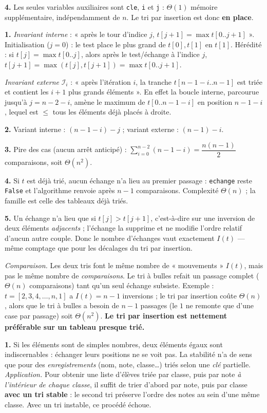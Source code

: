 \documentclass[11pt,a4paper]{article}
\begin{document}
\textbf{4.} Les seules variables auxiliaires sont \texttt{cle}, \texttt{i} et
\texttt{j} : $\Theta(1)$ mémoire supplémentaire, indépendamment de $n$. Le tri par
insertion est donc \textbf{en place}.

\reponse
\textbf{1.} \emph{Invariant interne} : « après le tour d'indice $j$, $t[j+1]=\max
t[0..j+1]$ ». Initialisation ($j=0$) : le test place le plus grand de $t[0],t[1]$ en
$t[1]$. Hérédité : si $t[j]=\max t[0..j]$, alors après le test/échange à l'indice $j$,
$t[j+1]=\max(t[j],t[j+1])=\max t[0..j+1]$. \checkmark

\emph{Invariant externe} $\mathcal I_i$ : « après l'itération $i$, la tranche
$t[n-1-i..n-1]$ est triée et contient les $i+1$ plus grands éléments ». En effet la
boucle interne, parcourue jusqu'à $j=n-2-i$, amène le maximum de $t[0..n-1-i]$ en
position $n-1-i$, lequel est $\le$ tous les éléments déjà placés à droite.

\textbf{2.} Variant interne : $(n-1-i)-j$ ; variant externe : $(n-1)-i$.

\textbf{3.} Pire des cas (aucun arrêt anticipé) :
$\sum_{i=0}^{n-2}(n-1-i)=\dfrac{n(n-1)}{2}$ comparaisons, soit $\Theta(n^{2})$.

\textbf{4.} Si $t$ est déjà trié, aucun échange n'a lieu au premier passage :
\texttt{echange} reste \texttt{False} et l'algorithme renvoie après $n-1$ comparaisons.
Complexité $\Theta(n)$ ; la famille est celle des tableaux déjà triés.

\textbf{5.} Un échange n'a lieu que si $t[j]>t[j+1]$, c'est-à-dire sur une inversion de
deux éléments \emph{adjacents} ; l'échange la supprime et ne modifie l'ordre relatif
d'aucun autre couple. Donc le nombre d'échanges vaut exactement $I(t)$ --- même comptage
que pour les décalages du tri par insertion.

\emph{Comparaison.} Les deux tris font le même nombre de « mouvements » $I(t)$, mais pas
le même nombre de \emph{comparaisons}. Le tri à bulles refait un passage complet
($\Theta(n)$ comparaisons) tant qu'un seul échange subsiste. Exemple :
$t=[2,3,4,\dots,n,1]$ a $I(t)=n-1$ inversions ; le tri par insertion coûte $\Theta(n)$,
alors que le tri à bulles a besoin de $n-1$ passages (le $1$ ne remonte que d'une case
par passage) soit $\Theta(n^{2})$. \textbf{Le tri par insertion est nettement préférable
sur un tableau presque trié.}

\reponse
\textbf{1.} Si les éléments sont de simples nombres, deux éléments égaux sont
indiscernables : échanger leurs positions ne se voit pas. La stabilité n'a de sens que
pour des \emph{enregistrements} (nom, note, classe\dots) triés selon une \emph{clé}
partielle.
\emph{Application.} Pour obtenir une liste d'élèves triée par classe, puis par note
\emph{à l'intérieur de chaque classe}, il suffit de trier d'abord par note, puis par
classe \textbf{avec un tri stable} : le second tri préserve l'ordre des notes au sein
d'une même classe. Avec un tri instable, ce procédé échoue.
\end{document}
